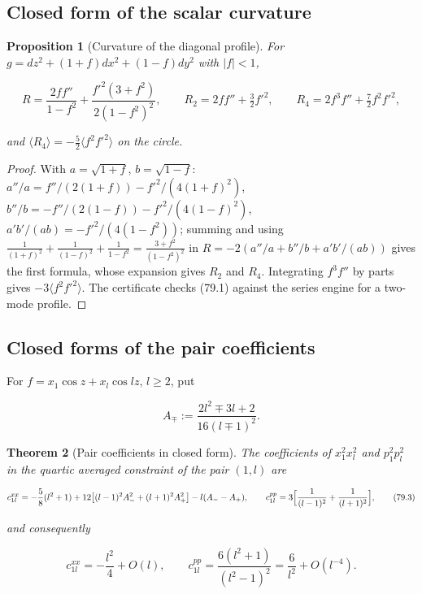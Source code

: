 \documentclass[11pt]{article}
\newtheorem{theorem}{Theorem}[section]
\newtheorem{proposition}[theorem]{Proposition}
\theoremstyle{remark}
\begin{document}
\subsection{Closed form of the scalar curvature}

\begin{proposition}[Curvature of the diagonal profile]
\label{prop:v19v76-curvature}
For \(g=dz^2+(1+f)dx^2+(1-f)dy^2\) with \(|f|<1\),

\[
 R=\frac{2ff''}{1-f^2}+\frac{f'^2(3+f^2)}{2(1-f^2)^2},
 \qquad
 R_2=2ff''+\tfrac32f'^2,\qquad
 R_4=2f^3f''+\tfrac72f^2f'^2,                                          \tag{79.1}
\]

and \(\langle R_4\rangle=-\tfrac52\langle f^2f'^2\rangle\) on the circle.
\end{proposition}

\begin{proof}
With \(a=\sqrt{1+f}\), \(b=\sqrt{1-f}\):
\(a''/a=f''/(2(1+f))-f'^2/(4(1+f)^2)\),
\(b''/b=-f''/(2(1-f))-f'^2/(4(1-f)^2)\),
\(a'b'/(ab)=-f'^2/(4(1-f^2))\); summing and using
\(\tfrac1{(1+f)^2}+\tfrac1{(1-f)^2}+\tfrac1{1-f^2}=\tfrac{3+f^2}{(1-f^2)^2}\)
in \(R=-2(a''/a+b''/b+a'b'/(ab))\) gives the first formula, whose
expansion gives \(R_2\) and \(R_4\).  Integrating \(f^3f''\) by parts
gives \(-3\langle f^2f'^2\rangle\).  The certificate checks (79.1)
against the series engine for a two-mode profile.
\end{proof}

\subsection{Closed forms of the pair coefficients}

For \(f=x_1\cos z+x_l\cos lz\), \(l\geq2\), put

\[
 A_\mp:=\frac{2l^2\mp3l+2}{16(l\mp1)^2}.                               \tag{79.2}
\]

\begin{theorem}[Pair coefficients in closed form]
\label{thm:v19v76-closed}
The coefficients of \(x_1^2x_l^2\) and \(p_1^2p_l^2\) in the quartic
averaged constraint of the pair \((1,l)\) are

\[
 c^{xx}_{1l}=-\frac58(l^2+1)+12\bigl[(l-1)^2A_-^2+(l+1)^2A_+^2\bigr]-l(A_--A_+),
 \qquad
 c^{pp}_{1l}=3\Bigl[\frac1{(l-1)^2}+\frac1{(l+1)^2}\Bigr],               \tag{79.3}
\]

and consequently

\[
 c^{xx}_{1l}=-\frac{l^2}4+O(l),\qquad
 c^{pp}_{1l}=\frac{6(l^2+1)}{(l^2-1)^2}=\frac6{l^2}+O(l^{-4}).           \tag{79.4}
\]
\end{theorem}
\end{document}
